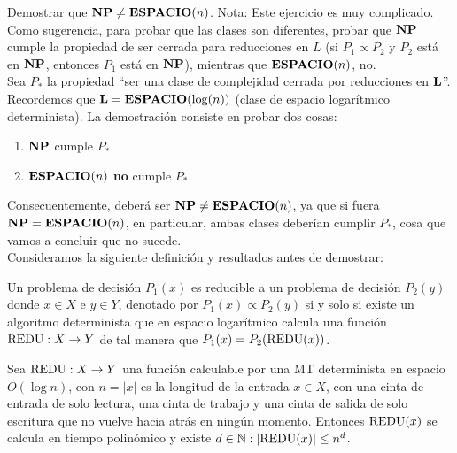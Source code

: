 \begin{ejercicio}
    Demostrar que $\textbf{NP} \neq \textbf{ESPACIO}(n)$. Nota: Este ejercicio es muy complicado. Como sugerencia, para probar que 
    las clases son diferentes, probar que $\textbf{NP}$ cumple la propiedad de ser cerrada para reducciones en $L$ 
    (si $P_1 \propto P_2$ y $P_2$ está en $\textbf{NP}$, entonces $P_1$ está en $\textbf{NP}$), mientras que $\textbf{ESPACIO}(n)$, no. \\

    Sea $P_{*}$ la propiedad ``ser una clase de complejidad cerrada por reducciones en $\textbf{L}$''. 
    Recordemos que $\textbf{L} = \textbf{ESPACIO}(\log(n))$ (clase de espacio logarítmico determinista). 
    La demostración consiste en probar dos cosas:
    \begin{enumerate}
        \item $\textbf{NP}$ cumple $P_{*}$.
        \item $\textbf{ESPACIO}(n)$ \textbf{no} cumple $P_{*}$.
    \end{enumerate}
    Consecuentemente, deberá ser $\textbf{NP} \neq \textbf{ESPACIO}(n)$, ya que si fuera $\textbf{NP} = \textbf{ESPACIO}(n)$, en particular, 
    ambas clases deberían cumplir $P_{*}$, cosa que vamos a concluir que no sucede. \\ 
    
    Consideramos la siguiente definición y resultados antes de demostrar:
    
    \begin{definicion}\label{definicion:reduc}
        Un problema de decisión $P_1(x)$ es reducible a un problema de
        decisión $P_2(y)$ donde $x \in X$ e $y \in Y$, denotado por $P_1(x) \propto P_2(y)$ si y solo si 
        existe un algoritmo determinista que en espacio logarítmico calcula una función $\text{REDU} : X \to Y$ 
        de tal manera que $P_1(x) = P_2 (\text{REDU}(x))$.
    \end{definicion}

    \begin{lema}\label{lema:tpol}
        Sea $\text{REDU}: X \to Y$ una función calculable por una MT
        determinista en espacio $O(\log n)$, con $n = |x|$ es la longitud de la entrada $x \in X$, con
        una cinta de entrada de solo lectura, una cinta de trabajo y una cinta de salida de solo escritura que no 
        vuelve hacia atrás en ningún momento. Entonces $\text{REDU}(x)$ se calcula en tiempo polinómico y existe $d \in \mathbb{N} : |\text{REDU}(x)| \leq n^d$.
    \end{lema} 
    

\end{ejercicio}
